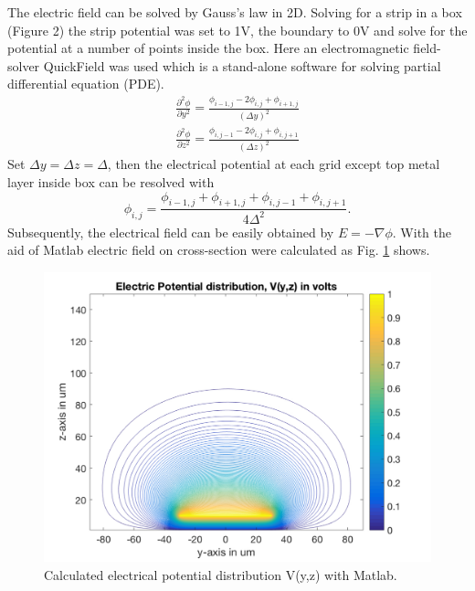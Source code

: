 \documentclass[11pt,final]{scrbook}
\begin{document}
The electric field can be solved by Gauss’s law in 2D. Solving for a strip in a box (Figure 2) the strip potential was set to 1V, the boundary to 0V and solve for the potential at a number of points inside the box. Here an electromagnetic field-solver QuickField was used which is a stand-alone software for solving partial differential equation (PDE). 
\begin{align}
\frac { { \partial  }^{ 2 }\phi  }{ \partial { y }^{ 2 } } =\frac { { \phi  }_{ i-1,j }-2{ \phi  }_{ i,j }+{ \phi  }_{ i+1,j } }{ { (\Delta y) }^{ 2 } }\\
\frac { { \partial  }^{ 2 }\phi  }{ \partial { z }^{ 2 } } =\frac { { \phi  }_{ i,j-1 }-2{ \phi  }_{ i,j }+{ \phi  }_{ i,j+1 } }{ { (\Delta z) }^{ 2 } }
\end{align}
Set $\Delta y=\Delta z=\Delta$, then the electrical potential at each grid except top metal layer inside box can be resolved with
\begin{equation}
{ \phi  }_{ i,j }=\frac { { \phi  }_{ i-1,j }+{ \phi  }_{ i+1,j }+{ \phi  }_{ i,j-1 }+{ \phi  }_{ i,j+1 } }{ 4\Delta ^{ 2 } }.
\end{equation}
Subsequently, the electrical field can be easily obtained by $E=-\nabla \phi$. With the aid of Matlab electric field on cross-section were calculated as Fig. \ref{fig:TL_C} shows.
\begin{figure}[htbp]
\begin{center}
\includegraphics[scale=0.3]{images/TL_C.pdf}
\caption{Calculated electrical potential distribution V(y,z) with Matlab.}
\label{fig:TL_C}
\end{center}
\end{figure}
\end{document}
